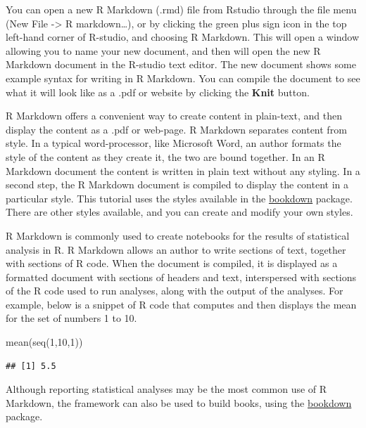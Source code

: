 \documentclass[
]{book}
\newenvironment{Shaded}{\begin{snugshade}}{\end{snugshade}}
\newcommand{\DecValTok}[1]{\textcolor[rgb]{0.00,0.00,0.81}{#1}}
\newcommand{\FunctionTok}[1]{\textcolor[rgb]{0.00,0.00,0.00}{#1}}
\newcommand{\NormalTok}[1]{#1}
\begin{document}
You can open a new R Markdown (.rmd) file from Rstudio through the file menu (New File -\textgreater{} R markdown\ldots), or by clicking the green plus sign icon in the top left-hand corner of R-studio, and choosing R Markdown. This will open a window allowing you to name your new document, and then will open the new R Markdown document in the R-studio text editor. The new document shows some example syntax for writing in R Markdown. You can compile the document to see what it will look like as a .pdf or website by clicking the \textbf{Knit} button.

R Markdown offers a convenient way to create content in plain-text, and then display the content as a .pdf or web-page. R Markdown separates content from style. In a typical word-processor, like Microsoft Word, an author formats the style of the content as they create it, the two are bound together. In an R Markdown document the content is written in plain text without any styling. In a second step, the R Markdown document is compiled to display the content in a particular style. This tutorial uses the styles available in the \href{https://bookdown.org/yihui/bookdown/}{bookdown} package. There are other styles available, and you can create and modify your own styles.

R Markdown is commonly used to create notebooks for the results of statistical analysis in R. R Markdown allows an author to write sections of text, together with sections of R code. When the document is compiled, it is displayed as a formatted document with sections of headers and text, interspersed with sections of the R code used to run analyses, along with the output of the analyses. For example, below is a snippet of R code that computes and then displays the mean for the set of numbers 1 to 10.

\begin{Shaded}
\begin{Highlighting}[]
\FunctionTok{mean}\NormalTok{(}\FunctionTok{seq}\NormalTok{(}\DecValTok{1}\NormalTok{,}\DecValTok{10}\NormalTok{,}\DecValTok{1}\NormalTok{))}
\end{Highlighting}
\end{Shaded}

\begin{verbatim}
## [1] 5.5
\end{verbatim}

Although reporting statistical analyses may be the most common use of R Markdown, the framework can also be used to build books, using the \href{https://bookdown.org/yihui/bookdown/}{bookdown} package.
\end{document}
